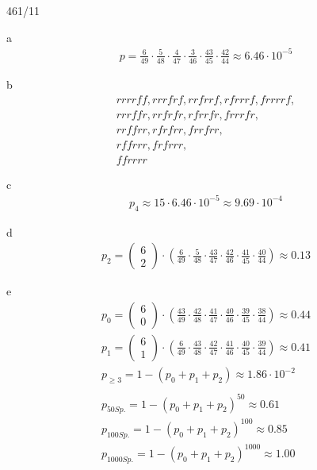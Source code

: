 \begin{exercise}{461/11}
  \item [a]
  \begin{gather*}
    p = \frac{6}{49} \cdot \frac{5}{48} \cdot \frac{4}{47} \cdot \frac{3}{46} \cdot \frac{43}{45} \cdot \frac{42}{44} \approx 6.46 \cdot 10^{-5}
  \end{gather*}
  \item [b]
  \begin{gather*}
    rrrrff, rrrfrf, rrfrrf, rfrrrf, frrrrf, \\
    rrrffr, rrfrfr, rfrrfr, frrrfr, \\
    rrffrr, rfrfrr, frrfrr, \\
    rffrrr, frfrrr, \\
    ffrrrr
  \end{gather*}
  \item [c]
  \begin{gather*}
    p_4 \approx 15 \cdot 6.46 \cdot 10^{-5} \approx 9.69 \cdot 10^{-4}
  \end{gather*}
  \item [d]
  \begin{gather*}
    p_2 = \begin{pmatrix}6 \\ 2\end{pmatrix} \cdot (\frac{6}{49} \cdot \frac{5}{48} \cdot \frac{43}{47} \cdot \frac{42}{46} \cdot \frac{41}{45} \cdot \frac{40}{44}) \approx 0.13
  \end{gather*}
  \item [e]
  \begin{gather*}
    p_0 = \begin{pmatrix}6 \\ 0\end{pmatrix} \cdot (\frac{43}{49} \cdot \frac{42}{48} \cdot \frac{41}{47} \cdot \frac{40}{46} \cdot \frac{39}{45} \cdot \frac{38}{44}) \approx 0.44 \\
    p_1 = \begin{pmatrix}6 \\ 1\end{pmatrix} \cdot (\frac{6}{49} \cdot \frac{43}{48} \cdot \frac{42}{47} \cdot \frac{41}{46} \cdot \frac{40}{45} \cdot \frac{39}{44}) \approx 0.41 \\
    p_{\geq 3} = 1 - (p_0 + p_1 + p_2) \approx 1.86 \cdot 10^{-2} \\\\
    p_{50Sp.} = 1 - (p_0 + p_1 + p_2)^{50} \approx 0.61 \\
    p_{100Sp.} = 1 - (p_0 + p_1 + p_2)^{100} \approx 0.85 \\
    p_{1000Sp.} = 1 - (p_0 + p_1 + p_2)^{1000} \approx 1.00
  \end{gather*}
\end{exercise}
